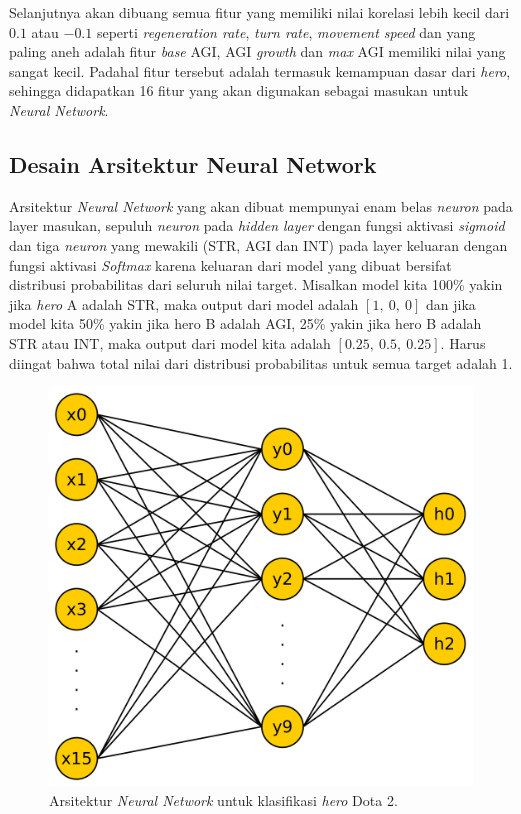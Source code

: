 Selanjutnya akan dibuang semua fitur yang memiliki nilai korelasi lebih kecil dari $0.1$ atau $-0.1$ seperti \textit{regeneration rate}, \textit{turn rate}, \textit{movement speed} dan yang paling aneh adalah fitur \textit{base} AGI, AGI \textit{growth} dan \textit{max} AGI memiliki nilai yang sangat kecil. Padahal fitur tersebut adalah termasuk kemampuan dasar dari \textit{hero}, sehingga didapatkan 16 fitur yang akan digunakan sebagai masukan untuk \textit{Neural Network}.
\vspace{1ex}

\subsection{Desain Arsitektur Neural Network}
\label{sec:sub_sec3_dota2_arch}
\vspace{1ex}

Arsitektur \textit{Neural Network} yang akan dibuat mempunyai enam belas \textit{neuron} pada layer masukan, sepuluh \textit{neuron} pada \textit{hidden layer} dengan fungsi aktivasi \textit{sigmoid} dan tiga \textit{neuron} yang mewakili (STR, AGI dan INT) pada layer keluaran dengan fungsi aktivasi \textit{Softmax} karena keluaran dari model yang dibuat bersifat distribusi probabilitas dari seluruh nilai target. Misalkan model kita 100\% yakin jika \textit{hero} A adalah STR, maka output dari model adalah $\left[1,\ 0,\ 0 \right]$ dan jika model kita 50\% yakin jika hero B adalah AGI, 25\% yakin jika hero B adalah STR atau INT, maka output dari model kita adalah $\left[0.25,\ 0.5,\ 0.25 \right]$. Harus diingat bahwa total nilai dari distribusi probabilitas untuk semua target adalah 1.
\vspace{1ex}

\begin{figure} [!h] \centering
	\includegraphics[scale=0.068]{img/nn_dota2.png}
	\caption{Arsitektur \textit{Neural Network} untuk klasifikasi \textit{hero} Dota 2.}
	\label{fig:nn_dota2}
\end{figure}

